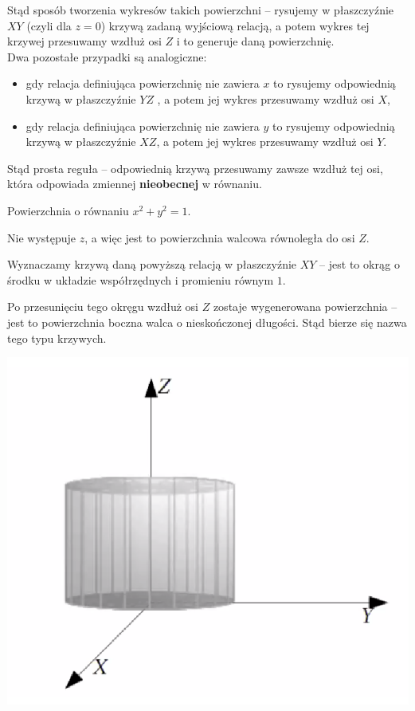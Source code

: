 Stąd sposób tworzenia wykresów takich powierzchni -- rysujemy w płaszczyźnie $XY$ (czyli dla $z=0$) krzywą zadaną wyjściową relacją,
a potem wykres tej krzywej przesuwamy wzdłuż osi $Z$ i to generuje daną powierzchnię. \\ 

Dwa pozostałe przypadki są analogiczne:

\begin{itemize}
    \item gdy relacja definiująca powierzchnię nie zawiera $x$ to rysujemy odpowiednią krzywą w płaszczyźnie $YZ$
    , a potem jej wykres przesuwamy wzdłuż osi $X$,
    \item gdy relacja definiująca powierzchnię nie zawiera $y$ to rysujemy odpowiednią krzywą w płaszczyźnie $XZ$,
    a potem jej wykres przesuwamy wzdłuż osi $Y$.
\end{itemize}

Stąd prosta reguła -- odpowiednią krzywą przesuwamy zawsze wzdłuż tej osi, która odpowiada zmiennej \textbf{nieobecnej} w równaniu. \\

\begin{przyklad}

Powierzchnia o równaniu $ x^2 + y^2 = 1 $.

Nie występuje $z$, a więc jest to powierzchnia walcowa równoległa do osi $Z$.

Wyznaczamy krzywą daną powyższą relacją w płaszczyźnie $XY$ -- jest to okrąg o środku w układzie współrzędnych i promieniu równym $1$.

Po przesunięciu tego okręgu wzdłuż osi $Z$ zostaje wygenerowana powierzchnia -- jest to powierzchnia boczna walca o nieskończonej długości.
Stąd bierze się nazwa tego typu krzywych.

\begin{center}
    \includegraphics[scale=0.6]{img/walec.png}
\end{center}

\end{przyklad}


